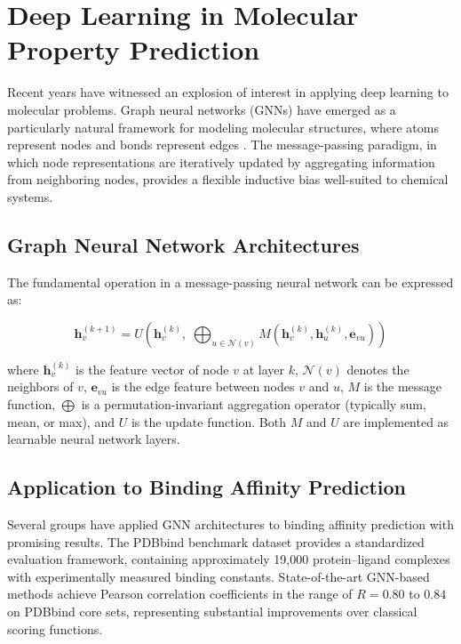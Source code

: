 \documentclass[12pt,oneside]{report}
\begin{document}
\section{Deep Learning in Molecular Property Prediction}

Recent years have witnessed an explosion of interest in applying deep learning to molecular problems. Graph neural networks (GNNs) have emerged as a particularly natural framework for modeling molecular structures, where atoms represent nodes and bonds represent edges \cite{Gilmer2017}. The message-passing paradigm, in which node representations are iteratively updated by aggregating information from neighboring nodes, provides a flexible inductive bias well-suited to chemical systems.

\subsection{Graph Neural Network Architectures}

The fundamental operation in a message-passing neural network can be expressed as:

\begin{equation}\label{eq:mpnn}
\mathbf{h}_v^{(k+1)} = U\left(\mathbf{h}_v^{(k)},\; \bigoplus_{u \in \mathcal{N}(v)} M\left(\mathbf{h}_v^{(k)}, \mathbf{h}_u^{(k)}, \mathbf{e}_{vu}\right)\right)
\end{equation}

where $\mathbf{h}_v^{(k)}$ is the feature vector of node $v$ at layer $k$, $\mathcal{N}(v)$ denotes the neighbors of $v$, $\mathbf{e}_{vu}$ is the edge feature between nodes $v$ and $u$, $M$ is the message function, $\bigoplus$ is a permutation-invariant aggregation operator (typically sum, mean, or max), and $U$ is the update function. Both $M$ and $U$ are implemented as learnable neural network layers.

\subsection{Application to Binding Affinity Prediction}

Several groups have applied GNN architectures to binding affinity prediction with promising results. The PDBbind benchmark dataset \cite{Wang2004} provides a standardized evaluation framework, containing approximately 19,000 protein--ligand complexes with experimentally measured binding constants. State-of-the-art GNN-based methods achieve Pearson correlation coefficients in the range of $R = 0.80$ to $0.84$ on PDBbind core sets, representing substantial improvements over classical scoring functions.
\end{document}
